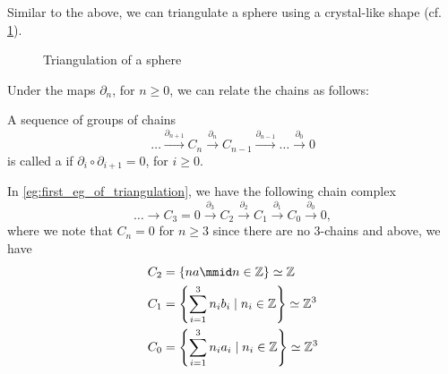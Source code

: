 \documentclass[notoc,notitlepage]{tufte-book}
\begin{document}
\begin{eg}
  Similar to the above, we can triangulate a sphere using a crystal-like shape
  (cf. \cref{fig:triangulation_of_a_sphere}).
  \begin{figure}[ht]
    \centering
    \caption{Triangulation of a sphere}
    \label{fig:triangulation_of_a_sphere}
  \end{figure}
\end{eg}

Under the maps $\partial_n$, for $n \geq 0$, we can relate the chains as
follows:

\begin{defn}\label{defn:chain_complex}
  A sequence of groups of chains
  \begin{equation*}
    \hdots \overset{\partial_{n + 1}}{\to} C_n \overset{\partial_n}{\to} C_{n -
    1} \overset{\partial_{n - 1}}{\to} \hdots \overset{\partial_0}{\to} 0
  \end{equation*}
  is called a  if $\partial_{i} \circ \partial_{i + 1} =
  0$, for $i \geq 0$.
\end{defn}

\begin{eg}
  In \cref{eg:first_eg_of_triangulation}, we have the following chain complex
  \begin{equation*}
    \hdots \to C_3 = 0 \overset{\partial_3}{\to} C_2 \overset{\partial_2}{\to}
    C_1 \overset{\partial_1}{\to} C_0 \overset{\partial_0}{\to} 0,
  \end{equation*}
  where we note that $C_n = 0$ for $n \geq 3$ since there are no $3$-chains and
  above, we have
  \begin{align*}
    C_2 &= \left\{ na \mmid n \in \mathbb{Z} \right\} \simeq \mathbb{Z} \\
    C_1 &= \left\{ \sum_{i=1}^{3} n_i b_i \mid n_i \in \mathbb{Z} \right\}
      \simeq \mathbb{Z}^3 \\
    C_0 &= \left\{ \sum_{i=1}^{3} n_i a_i \mid n_i \in \mathbb{Z} \right\}
      \simeq \mathbb{Z}^3
  \end{align*}
\end{eg}
\end{document}
